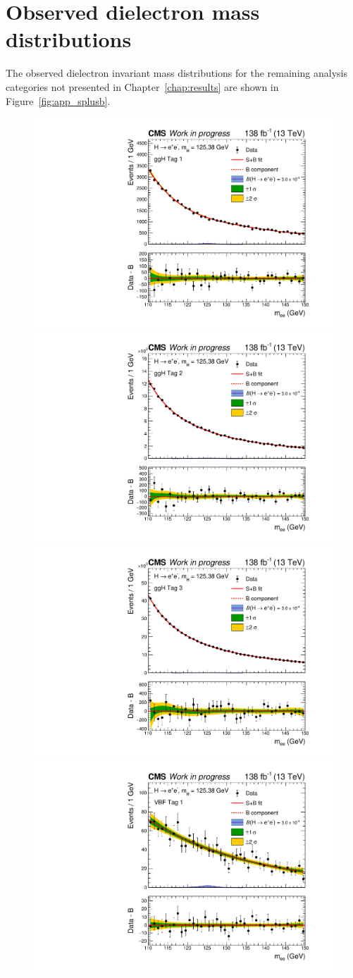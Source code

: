 \chapter{Observed dielectron mass distributions}

The observed dielectron invariant mass distributions for the remaining analysis categories not presented in Chapter~\ref{chap:results} are shown in Figure~\ref{fig:app_splusb}.

\begin{figure}[htbp!]
\centering
\includegraphics[width =0.46\linewidth]{Figures/Hee/Results/SPlusBModels/gghcat1_CMS_hgg_mass.pdf}\hfill
\includegraphics[width =0.46\linewidth]{Figures/Hee/Results/SPlusBModels/gghcat2_CMS_hgg_mass.pdf}\hfill\\%
\includegraphics[width =0.46\linewidth]{Figures/Hee/Results/SPlusBModels/gghcat3_CMS_hgg_mass.pdf}\hfill
\includegraphics[width =0.46\linewidth]{Figures/Hee/Results/SPlusBModels/vbfcat1_CMS_hgg_mass.pdf}\hfill\\

\end{figure}

